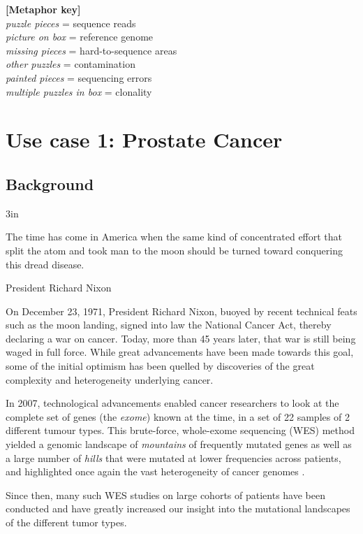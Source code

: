 \begin{center}
\begin{minipage}{6in}
\begin{center}
{\vspace*{0.5cm}
\textbf{[Metaphor key]} \\
\textit{puzzle pieces} = sequence reads \\
\textit{picture on box} = reference genome \\
\textit{missing pieces} = hard-to-sequence areas \\
\textit{other puzzles} = contamination \\
\textit{painted pieces} = sequencing errors \\
\textit{multiple puzzles in box} = clonality
}

\end{center}
\end{minipage}
\end{center}

\section{Use case 1: Prostate Cancer}
\subsection{Background}
\epigraph{3in}{The time has come in America when the same kind of concentrated effort that split the atom and took man to the moon should be turned toward conquering this dread disease.}{President Richard Nixon}

On December 23, 1971, President Richard Nixon, buoyed by recent technical feats such as the moon landing, signed into law the National Cancer Act, thereby declaring a war on cancer. Today, more than 45 years later, that war is still being waged in full force. While great advancements have been made towards this goal, some of the initial optimism has been quelled by discoveries of the great complexity and heterogeneity underlying cancer.

In 2007, technological advancements enabled cancer researchers to look at the complete set of genes (the \textit{exome}) known at the time, in a set of 22 samples of 2 different tumour types. This brute-force, whole-exome sequencing (WES) method yielded a genomic landscape of \textit{mountains} of frequently mutated genes as well as a large number of \textit{hills} that were mutated at lower frequencies across patients, and highlighted once again the vast heterogeneity of cancer genomes \cite{wood2007genomic}.

Since then, many such WES studies on large cohorts of patients have been conducted \cite{wheeler2013human} and have greatly increased our insight into the mutational landscapes of the different tumor types.

